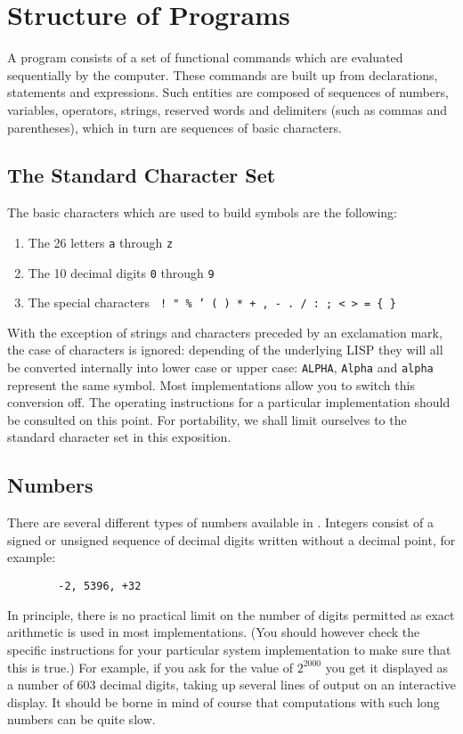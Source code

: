 \chapter{Structure of Programs}

A {\REDUCE} program consists of a set of
functional commands which are evaluated sequentially by the computer.
These commands are built up from declarations, statements and expressions.
Such entities are composed of sequences of numbers, variables, operators,
strings, reserved words and delimiters (such as commas and parentheses),
which in turn are sequences of basic characters.

\section{The {\REDUCE} Standard Character Set}

The basic characters which are used to build
{\REDUCE} symbols are the following:
\begin{enumerate}
\item The 26 letters \texttt{a} through \texttt{z}
\item The 10 decimal digits \texttt{0} through \texttt{9}
\item The special characters \texttt{\frenchspacing{}
      \textunderscore{} ! " \textdollar{}
      \% ' ( ) * + , - . / : ; < > = \{ \} }
\end{enumerate}
With the exception of strings and characters preceded by an
exclamation mark, the case
of characters is ignored: depending of the underlying LISP
they will all be converted internally into lower case or
upper case: \texttt{ALPHA}, \texttt{Alpha} and \texttt{alpha}
represent the same symbol.  Most implementations allow you to switch
this conversion off. The operating instructions for a particular
implementation should be consulted on this point. For portability, we
shall limit ourselves to the standard character set in this exposition.

\section{Numbers}

There are several different types of numbers available in
\REDUCE.  Integers consist of a signed or unsigned sequence of decimal
digits written without a decimal point, for example:
\begin{verbatim}
        -2, 5396, +32
\end{verbatim}
In principle, there is no practical limit on the number of digits
permitted as exact arithmetic is used in most implementations. (You should
however check the specific instructions for your particular system
implementation to make sure that this is true.) For example, if you ask
for the value of $2^{2000}$ you get it
displayed as a number of 603 decimal digits, taking up several lines of
output on an interactive display.  It should be borne in mind of course
that computations with such long numbers can be quite slow.

